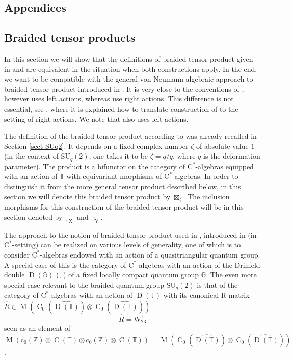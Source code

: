 \documentclass[12pt,reqno,a4paper]{amsart}
\theoremstyle{definition}
\newcommand{\cst}{\ensuremath{\mathrm{C}^*}}
\newcommand{\hh}[1]{\widehat{#1}}
\newcommand{\tens}{\otimes}
\newcommand{\GG}{\mathbb{G}}
\newcommand{\TT}{\mathbb{T}}
\newcommand{\ZZ}{\mathbb{Z}}
\newcommand{\sX}{\mathsf{X}}
\newcommand{\sY}{\mathsf{Y}}
\newcommand{\ww}{\mathrm{W}}
\DeclareMathOperator{\C}{C}
\DeclareMathOperator{\D}{D}
\DeclareMathOperator{\M}{M}
\newcommand{\SU}{\mathrm{SU}}
\numberwithin{equation}{section}
\begin{document}
\begin{appendices}

\section{Appendices}

\subsection{Braided tensor products}\label{app-BraidedTP}

In this section we will show that the definitions of braided tensor product given in \cite{BraidedSU2} and \cite{MeyerRoyWoronowiczI,MeyerRoyWoronowiczII} are equivalent in the situation when both constructions apply. In the end, we want to be compatible with the general von Neumann algebraic approach to braided tensor product introduced in \cite{DeCommerKrajczok}. It is very close to the conventions of \cite{MeyerRoyWoronowiczII}, however \cite{DeCommerKrajczok} uses left actions, whereas \cite{MeyerRoyWoronowiczI,MeyerRoyWoronowiczII} use right actions. This difference is not essential, see \cite[Section 9.2]{DeCommerKrajczok}, where it is explained how to translate construction of \cite{DeCommerKrajczok} to the setting of right actions. We note that \cite{BraidedSU2} also uses left actions.

The definition of the braided tensor product according to \cite{BraidedSU2} was already recalled in Section \ref{sect-SUq2}. It depends on a fixed complex number $\zeta$ of absolute value $1$ (in the context of $\SU_q(2)$, one takes it to be $\zeta=q/\overline{q}$, where $q$ is the deformation parameter). The product is a bifunctor on the category of \cst-algebras equipped with an action of $\TT$ with equivariant morphisms of \cst-algebras. In order to distinguish it from the more general tensor product described below, in this section we will denote this braided tensor product by $\boxtimes_\zeta$. The inclusion morphisms for this construction of the braided tensor product will be in this section denoted by $\jmath_\sX$ and $\jmath_\sY$.

The approach to the notion of braided tensor product used in \cite{MeyerRoyWoronowiczII, MeyerRoyWoronowiczI}, introduced in \cite[Section 3.2]{MeyerRoyWoronowiczI} (in \cst-setting) can be realized on various levels of generality, one of which is to consider \cst-algebras endowed with an action of a quasitriangular quantum group. A special case of this is the category of \cst-algebras with an action of the Drinfeld double $\D(\GG)$ (\cite[Section 4]{PodlesWoronowiczQLG}, \cite{Yamanouchi}) of a fixed locally compact quantum group $\GG$. The even more special case relevant to the braided quantum group $\SU_q(2)$ is that of the category of \cst-algebras with an action of $\D(\TT)$ with its canonical $\mathrm{R}$-matrix $\hh{R}\in\M(\C_0(\hh{\D(\TT)})\tens\C_0(\hh{\D(\TT)}))$
\begin{equation}\label{eq-eq25}
\hh{R}=\ww^\TT_{23}
\end{equation}
seen as an element of $\M(\mathrm{c}_0(\ZZ)\tens\C(\TT)\tens\mathrm{c}_0(\ZZ)\tens\C(\TT))=\M(\C_0(\hh{\D(\TT)})\tens\C_0(\hh{\D(\TT)}))$.


\end{appendices}
\end{document}
